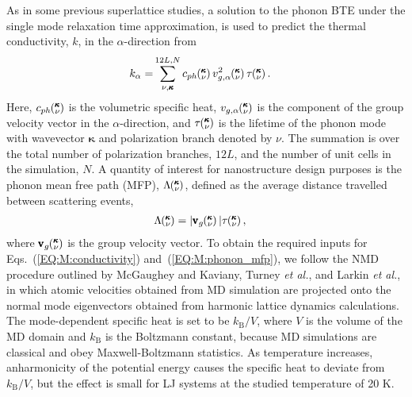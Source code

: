 \documentclass[aps,prb,preprint,preprintnumbers,amsmath,amssymb,floatfix,superscriptaddress]{revtex4}
\newcommand{\kv}{\mspace{-4.0mu}\left(\mspace{-8.0mu}
\begin{smallmatrix}&\pmb{\kappa} \\&\nu\end{smallmatrix}
\mspace{-3.0mu}\right)}
\begin{document}
As in some previous superlattice studies, \cite{Luckyanova16112012,doi:10.1021/nl202186y,savic:073113,PhysRevB.87.140302} a solution to the phonon BTE under the single mode relaxation time approximation,\cite{ziman_electrons_2001} is used to predict the thermal conductivity, $k$, in the $\alpha$-direction from
\begin{equation}\label{EQ:M:conductivity}
\begin{split}
k_{\mathbf{\alpha}}=&\sum_{\nu,\pmb{\kappa}}^{12L,N} c_{ph}\kv
v^{2}_{g,\mathbf{\alpha}}\kv \tau\kv.
\end{split}
\end{equation}
Here, $c_{ph}\kv$ is the volumetric specific heat, $v_{g,\mathbf{\alpha}}\kv$ is the component of the group velocity vector in the $\alpha$-direction, and $\tau\kv$ is the lifetime of the phonon mode with wavevector $\pmb{\kappa}$ and polarization branch denoted by $\nu$. The summation is over the total number of polarization branches, $12L$, and the number of unit cells in the simulation, $N$. A quantity of interest for nanostructure design purposes \cite{PhysRevB.87.035437} is the phonon mean free path (MFP), $\Lambda\kv$, defined as the average distance travelled between scattering events, \cite{ziman_electrons_2001}
\begin{equation}\label{EQ:M:phonon_mfp}
\begin{split}
\Lambda\kv &= |\pmb{\mathrm{v}}_{g}\kv | \tau\kv,
\end{split}
\end{equation}
where $\pmb{\mathrm{v}}_{g}\kv$ is the group velocity vector. To obtain the required inputs for Eqs.~(\ref{EQ:M:conductivity}) and~(\ref{EQ:M:phonon_mfp}), we follow the NMD procedure outlined by McGaughey and Kaviany,\cite{PhysRevB.71.184305} Turney \textit{et al.},\cite {PhysRevB.79.064301} and Larkin \textit{et al.},\cite{jason_inpress} in which atomic velocities obtained from MD simulation are projected onto the normal mode eigenvectors obtained from harmonic lattice dynamics calculations. The mode-dependent specific heat is set to be $k_\mathrm{B}/V$, where $V$ is the volume of the MD domain and $k_\mathrm{B}$ is the Boltzmann constant, because MD simulations are classical and obey Maxwell-Boltzmann statistics. As temperature increases, anharmonicity of the potential energy causes the specific heat to deviate from $k_\mathrm{B}/V$, but the effect is small for LJ systems at the studied temperature of 20 K.\cite{PhysRevB.71.184305} 
\end{document}
